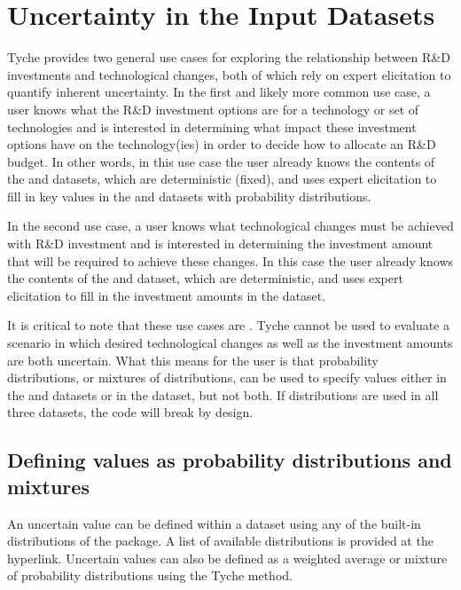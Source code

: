 \documentclass[letterpaper,10pt,english]{sphinxmanual}
\begin{document}
\section{Uncertainty in the Input Datasets}
\label{\detokenize{cheat-sheet:uncertainty-in-the-input-datasets}}
Tyche provides two general use cases for exploring the relationship between R\&D investments and technological changes, both of which rely on expert elicitation to quantify inherent uncertainty. In the first and likely more common use case, a user knows what the R\&D investment options are for a technology or set of technologies and is interested in determining what impact these investment options have on the technology(ies) in order to decide how to allocate an R\&D budget. In other words, in this use case the user already knows the contents of the  and  datasets, which are deterministic (fixed), and uses expert elicitation to fill in key values in the  and  datasets with probability distributions.

In the second use case, a user knows what technological changes must be achieved with R\&D investment and is interested in determining the investment amount that will be required to achieve these changes. In this case the user already knows the contents of the  and  dataset, which are deterministic, and uses expert elicitation to fill in the investment amounts in the  dataset.

It is critical to note that these use cases are . Tyche cannot be used to evaluate a scenario in which desired technological changes as well as the investment amounts are both uncertain. What this means for the user is that probability distributions, or mixtures of distributions, can be used to specify values either in the  and  datasets or in the  dataset, but not both. If distributions are used in all three datasets, the code will break by design.


\subsection{Defining values as probability distributions and mixtures}
\label{\detokenize{cheat-sheet:defining-values-as-probability-distributions-and-mixtures}}
An uncertain value can be defined within a dataset using any of the built-in distributions of the  package. A list of available distributions is provided at the hyperlink. Uncertain values can also be defined as a weighted average or mixture of probability distributions using the Tyche  method.
\end{document}
